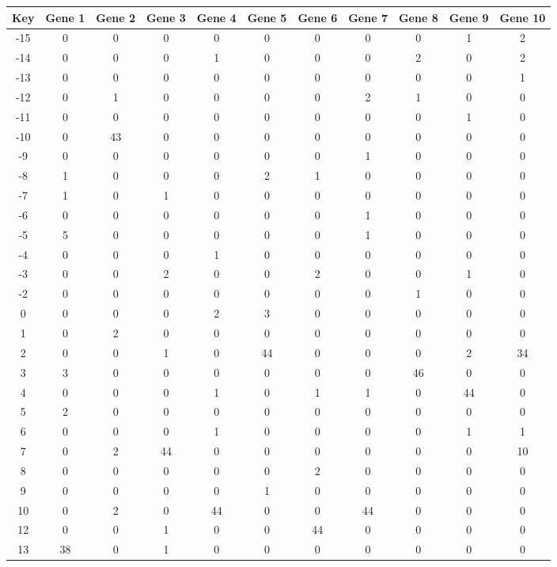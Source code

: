 \begin{tabular}{|c|c|c|c|c|c|c|c|c|c|c|}
\hline
Key & Gene 1 & Gene 2 & Gene 3 & Gene 4 & Gene 5 & Gene 6 & Gene 7 & Gene 8 & Gene 9 & Gene 10 \\
\hline
-15 & 0 & 0 & 0 & 0 & 0 & 0 & 0 & 0 & 1 & 2 \\
-14 & 0 & 0 & 0 & 1 & 0 & 0 & 0 & 2 & 0 & 2 \\
-13 & 0 & 0 & 0 & 0 & 0 & 0 & 0 & 0 & 0 & 1 \\
-12 & 0 & 1 & 0 & 0 & 0 & 0 & 2 & 1 & 0 & 0 \\
-11 & 0 & 0 & 0 & 0 & 0 & 0 & 0 & 0 & 1 & 0 \\
-10 & 0 & 43 & 0 & 0 & 0 & 0 & 0 & 0 & 0 & 0 \\
-9 & 0 & 0 & 0 & 0 & 0 & 0 & 1 & 0 & 0 & 0 \\
-8 & 1 & 0 & 0 & 0 & 2 & 1 & 0 & 0 & 0 & 0 \\
-7 & 1 & 0 & 1 & 0 & 0 & 0 & 0 & 0 & 0 & 0 \\
-6 & 0 & 0 & 0 & 0 & 0 & 0 & 1 & 0 & 0 & 0 \\
-5 & 5 & 0 & 0 & 0 & 0 & 0 & 1 & 0 & 0 & 0 \\
-4 & 0 & 0 & 0 & 1 & 0 & 0 & 0 & 0 & 0 & 0 \\
-3 & 0 & 0 & 2 & 0 & 0 & 2 & 0 & 0 & 1 & 0 \\
-2 & 0 & 0 & 0 & 0 & 0 & 0 & 0 & 1 & 0 & 0 \\
0 & 0 & 0 & 0 & 2 & 3 & 0 & 0 & 0 & 0 & 0 \\
1 & 0 & 2 & 0 & 0 & 0 & 0 & 0 & 0 & 0 & 0 \\
2 & 0 & 0 & 1 & 0 & 44 & 0 & 0 & 0 & 2 & 34 \\
3 & 3 & 0 & 0 & 0 & 0 & 0 & 0 & 46 & 0 & 0 \\
4 & 0 & 0 & 0 & 1 & 0 & 1 & 1 & 0 & 44 & 0 \\
5 & 2 & 0 & 0 & 0 & 0 & 0 & 0 & 0 & 0 & 0 \\
6 & 0 & 0 & 0 & 1 & 0 & 0 & 0 & 0 & 1 & 1 \\
7 & 0 & 2 & 44 & 0 & 0 & 0 & 0 & 0 & 0 & 10 \\
8 & 0 & 0 & 0 & 0 & 0 & 2 & 0 & 0 & 0 & 0 \\
9 & 0 & 0 & 0 & 0 & 1 & 0 & 0 & 0 & 0 & 0 \\
10 & 0 & 2 & 0 & 44 & 0 & 0 & 44 & 0 & 0 & 0 \\
12 & 0 & 0 & 1 & 0 & 0 & 44 & 0 & 0 & 0 & 0 \\
13 & 38 & 0 & 1 & 0 & 0 & 0 & 0 & 0 & 0 & 0 \\
\hline
\end{tabular}